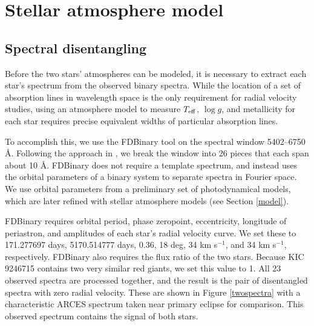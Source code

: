 \section{Stellar atmosphere model}\label{atm}

\subsection{Spectral disentangling}\label{disentangle}
Before the two stars' atmospheres can be modeled, it is necessary to extract each star's spectrum from the observed binary spectra. While the location of a set of absorption lines in wavelength space is the only requirement for radial velocity studies, using an atmosphere model to measure $T_{\rm{eff}}$, $\log g$, and metallicity for each star requires precise equivalent widths of particular absorption lines.

To accomplish this, we use the FDBinary tool \citep{ili04} on the spectral window 5402--6750 \AA. Following the approach in \citet{bec14}, we break the window into 26 pieces that each span about 10 \AA. FDBinary does not require a template spectrum, and instead uses the orbital parameters of a binary system to separate spectra in Fourier space. We use orbital parameters from a preliminary set of photodynamical models, which are later refined with stellar atmosphere models (see Section \ref{model}).

FDBinary requires orbital period, phase zeropoint, eccentricity, longitude of periastron, and amplitudes of each star's radial velocity curve. We set these to 171.277697 days, 5170.514777 days, 0.36, 18 deg, 34 km s$^{-1}$, and 34 km s$^{-1}$, respectively. FDBinary also requires the flux ratio of the two stars. Because KIC 9246715 contains two very similar red giants, we set this value to 1. All 23 observed spectra are processed together, and the result is the pair of disentangled spectra with zero radial velocity. These are shown in Figure \ref{twospectra} with a characteristic ARCES spectrum taken near primary eclipse for comparison. This observed spectrum contains the signal of both stars.

